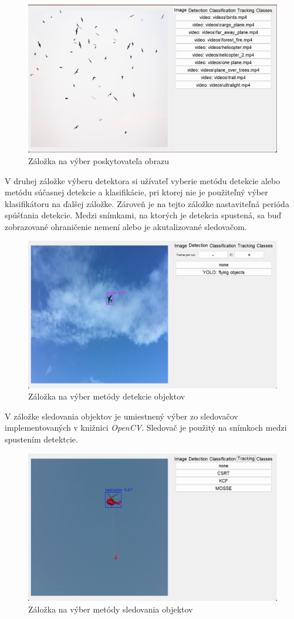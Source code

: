         \begin{figure}[H]
            \centering
            \includegraphics[width=.7\textwidth]{obrazky/app/image_provider.png}
            \caption{Záložka na výber poskytovateľa obrazu}
        \end{figure}

        V druhej záložke výberu detektora si užívateľ vyberie metódu detekcie alebo metódu súčasnej detekcie a klasifikácie, pri ktorej nie je použiteľný výber klasifikátoru na ďalšej záložke. Zároveň je na tejto záložke nastaviteľná perióda spúšťania detekcie. Medzi snímkami, na ktorých je detekcia spustená, sa buď zobrazované ohraničenie nemení alebo je akutalizované sledovačom.

        \begin{figure}[H]
            \centering
            \includegraphics[width=.7\textwidth]{obrazky/app/detector.png}
            \caption{Záložka na výber metódy detekcie objektov}
        \end{figure}

        V záložke sledovania objektov je umiestnený výber zo sledovačov implementovaných v knižnici \emph{OpenCV}. Sledovač je použitý na snímkoch medzi spustením detektcie.

        \begin{figure}[H]
            \centering
            \includegraphics[width=.7\textwidth]{obrazky/app/tracker.png}
            \caption{Záložka na výber metódy sledovania objektov}
        \end{figure}

